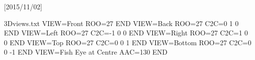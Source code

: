 \usepackage{xcolor}

\usepackage{hyperref}
\usepackage[UKenglish]{babel}

\usepackage{media9}[2015/11/02]

\newcommand{\columnsbegin}{\begin{columns}}
\newcommand{\columnsend}{\end{columns}}

\newcommand{\col}[1]{\column{#1\textwidth}}


\usepackage[ruled,vlined,linesnumbered]{algorithm2e}




\usepackage{filecontents}
\begin{filecontents*}{3Dviews.txt}
VIEW=Front
  ROO=27
END
VIEW=Back
  ROO=27
  C2C=0 1 0
END
VIEW=Left
  ROO=27
  C2C=-1 0 0
END
VIEW=Right
  ROO=27
  C2C=1 0 0
END
VIEW=Top
  ROO=27
  C2C=0 0 1
END
VIEW=Bottom
  ROO=27
  C2C=0 0 -1
END
VIEW=Fish Eye at Centre
  AAC=130
END
\end{filecontents*}
